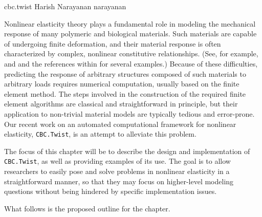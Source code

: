 \def\bone{{1}}
\def\Bepsilon{\mbox{$\epsilon$}}
\def\Bvarphi{\mbox{$\varphi$}}
\def\bB{\mbox{$ B$}}
\def\bC{\mbox{$ C$}}
\def\bE{\mbox{$ E$}}
\def\bF{\mbox{$ F$}}
\def\bN{\mbox{$ N$}}
\def\bP{\mbox{$ P$}}
\def\bS{\mbox{$ S$}}
\def\bT{\mbox{$ T$}}
\def\bX{\mbox{$ X$}}
\def\ba{\mbox{$ a$}}
\def\bb{\mbox{$ b$}}
\def\be{\mbox{$ e$}}
\def\bg{\mbox{$ g$}}
\def\br{\mbox{$ r$}}
\def\bu{\mbox{$ u$}}
\def\bv{\mbox{$ v$}}
\def\bw{\mbox{$ w$}}
\def\twist{{\tt CBC.Twist}}

{cbc.twist}
{Harish Narayanan}
{narayanan}

Nonlinear elasticity theory plays a fundamental role in modeling the
mechanical response of many polymeric and biological materials. Such
materials are capable of undergoing finite deformation, and their
material response is often characterized by complex, nonlinear
constitutive relationships. (See, for example, \citep{Holzapfel2000}
and \citep{TruesdellNoll1965} and the references within for several
examples.) Because of these difficulties, predicting the response of
arbitrary structures composed of such materials to arbitrary loads
requires numerical computation, usually based on the finite element
method. The steps involved in the construction of the required finite
element algorithms are classical and straightforward in principle, but
their application to non-trivial material models are typically tedious
and error-prone. Our recent work on an automated computational
framework for nonlinear elasticity, \twist, is an attempt to alleviate
this problem.

The focus of this chapter will be to describe the design and
implementation of \twist, as well as providing examples of its
use. The goal is to allow researchers to easily pose and solve
problems in nonlinear elasticity in a straightforward manner, so that
they may focus on higher-level modeling questions without being
hindered by specific implementation issues.

What follows is the proposed outline for the chapter.

